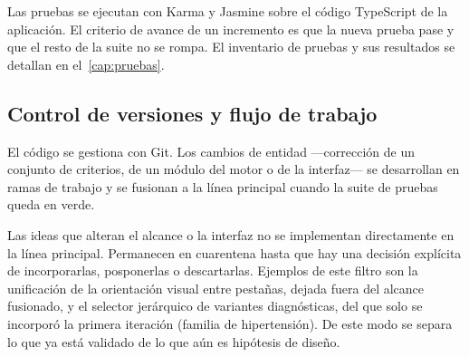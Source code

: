 Las pruebas se ejecutan con Karma y Jasmine sobre el código TypeScript
de la aplicación. El criterio de avance de un incremento es que la
nueva prueba pase y que el resto de la suite no se rompa. El inventario
de pruebas y sus resultados se detallan en el~\cref{cap:pruebas}.

\subsection{Control de versiones y flujo de trabajo}

El código se gestiona con Git. Los cambios de entidad ---corrección de
un conjunto de criterios, de un módulo del motor o de la interfaz--- se
desarrollan en ramas de trabajo y se fusionan a la línea principal
cuando la suite de pruebas queda en verde.

Las ideas que alteran el alcance o la interfaz no se implementan
directamente en la línea principal. Permanecen en cuarentena hasta que
hay una decisión explícita de incorporarlas, posponerlas o
descartarlas. Ejemplos de este filtro son la unificación de la
orientación visual entre pestañas, dejada fuera del alcance fusionado, y
el selector jerárquico de variantes diagnósticas, del que solo se
incorporó la primera iteración (familia de hipertensión). De este modo
se separa lo que ya está validado de lo que aún es hipótesis de diseño.
